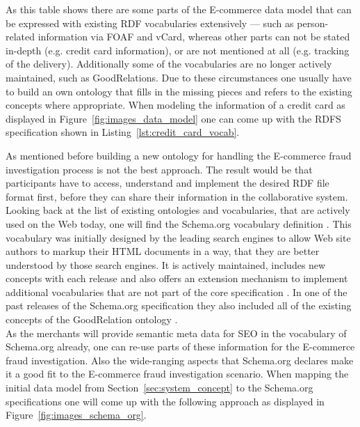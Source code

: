 As this table shows there are some parts of the \gls{E-commerce} data model that can be expressed with existing \gls{RDF} vocabularies extensively --- such as person-related information via \gls{FOAF} and \gls{vCard}, whereas other parts can not be stated in-depth (e.g. credit card information), or are not mentioned at all (e.g. tracking of the delivery). Additionally some of the vocabularies are no longer actively maintained, such as GoodRelations. Due to these circumstances one usually have to build an own ontology that fills in the missing pieces and refers to the existing concepts where appropriate. When modeling the information of a credit card as displayed in Figure~\ref{fig:images_data_model} one can come up with the \gls{RDFS} specification shown in Listing~\ref{lst:credit_card_vocab}. \@


As mentioned before building a new ontology for handling the \gls{E-commerce} fraud investigation process is not the best approach. The result would be that participants have to access, understand and implement the desired \gls{RDF} file format first, before they can share their information in the collaborative system. Looking back at the list of existing ontologies and vocabularies, that are actively used on the Web today, one will find the Schema.org vocabulary definition \citep{Schema.org}. This vocabulary was initially designed by the leading search engines to allow Web site authors to markup their \gls{HTML} documents in a way, that they are better understood by those search engines. It is actively maintained, includes new concepts with each release and also offers an extension mechanism to implement additional vocabularies that are not part of the core specification \citep{SchemaExtensions}. In one of the past releases of the Schema.org specification they also included all of the existing concepts of the GoodRelation ontology \citep{SchemaGoodRelation}. \\

As the merchants will provide semantic meta data for \gls{SEO} in the vocabulary of Schema.org already, one can re-use parts of these information for the \gls{E-commerce} fraud investigation. Also the wide-ranging aspects that Schema.org declares make it a good fit to the \gls{E-commerce} fraud investigation scenario. When mapping the initial data model from Section~\ref{sec:system_concept} to the Schema.org specifications one will come up with the following approach as displayed in Figure~\ref{fig:images_schema_org}. \@

